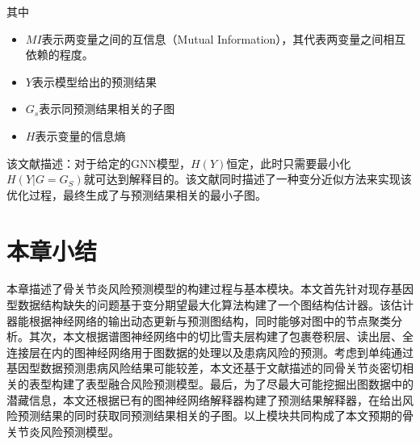 其中

\begin{itemize}
\item
  \(MI\)表示两变量之间的互信息（Mutual
  Information），其代表两变量之间相互依赖的程度。
\item
  \(Y\)表示模型给出的预测结果
\item
  \(G_s\)表示同预测结果相关的子图
\item
  \(H\)表示变量的信息熵
\end{itemize}

该文献描述：对于给定的GNN模型，$H(Y)$恒定，此时只需要最小化$ H(Y|G=G_S)$就可达到解释目的。该文献同时描述了一种变分近似方法来实现该优化过程，最终生成了与预测结果相关的最小子图。

\section{本章小结}
本章描述了骨关节炎风险预测模型的构建过程与基本模块。本文首先针对现存基因型数据结构缺失的问题基于变分期望最大化算法构建了一个图结构估计器。该估计器能根据神经网络的输出动态更新与预测图结构，同时能够对图中的节点聚类分析。其次，本文根据谱图神经网络中的切比雪夫层构建了包裹卷积层、读出层、全连接层在内的图神经网络用于图数据的处理以及患病风险的预测。考虑到单纯通过基因型数据预测患病风险结果可能较差，本文还基于文献描述的同骨关节炎密切相关的表型构建了表型融合风险预测模型。最后，为了尽最大可能挖掘出图数据中的潜藏信息，本文还根据已有的图神经网络解释器构建了预测结果解释器，在给出风险预测结果的同时获取同预测结果相关的子图。以上模块共同构成了本文预期的骨关节炎风险预测模型。 